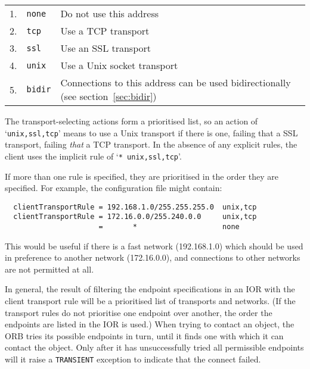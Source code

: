 \documentclass[11pt,oneside,a4paper]{book}
\newcommand{\code}[1]{\texttt{#1}}
\newcommand{\dsc}{\discretionary{}{}{}}
\begin{document}
\vspace{\baselineskip}

\begin{tabular}{llp{}}
1. & \code{none} & Do not use this address\\
2. & \code{tcp}  & Use a TCP transport\\
3. & \code{ssl}  & Use an SSL transport\\
4. & \code{unix} & Use a Unix socket transport\\
5. & \code{bidir}& Connections to this address can be used
                   bidirectionally (see section~\ref{sec:bidir})\\
\end{tabular}

\vspace{\baselineskip}

\noindent The transport-selecting actions form a prioritised list, so
an action of `\code{unix,ssl,\dsc{}tcp}' means to use a Unix transport if
there is one, failing that a SSL transport, failing \emph{that} a TCP
transport. In the absence of any explicit rules, the client uses the
implicit rule of `\code{* unix,ssl,tcp}'.

If more than one rule is specified, they are prioritised in the order
they are specified. For example, the configuration file might contain:

\begin{verbatim}
  clientTransportRule = 192.168.1.0/255.255.255.0  unix,tcp
  clientTransportRule = 172.16.0.0/255.240.0.0     unix,tcp
                      =       *                    none
\end{verbatim}

\noindent This would be useful if there is a fast network
(192.168.1.0) which should be used in preference to another network
(172.16.0.0), and connections to other networks are not permitted at
all.

In general, the result of filtering the endpoint specifications in an
IOR with the client transport rule will be a prioritised list of
transports and networks. (If the transport rules do not prioritise one
endpoint over another, the order the endpoints are listed in the IOR
is used.)  When trying to contact an object, the ORB tries its
possible endpoints in turn, until it finds one with which it can
contact the object. Only after it has unsuccessfully tried all
permissible endpoints will it raise a \code{TRANSIENT} exception to
indicate that the connect failed.
\end{document}
